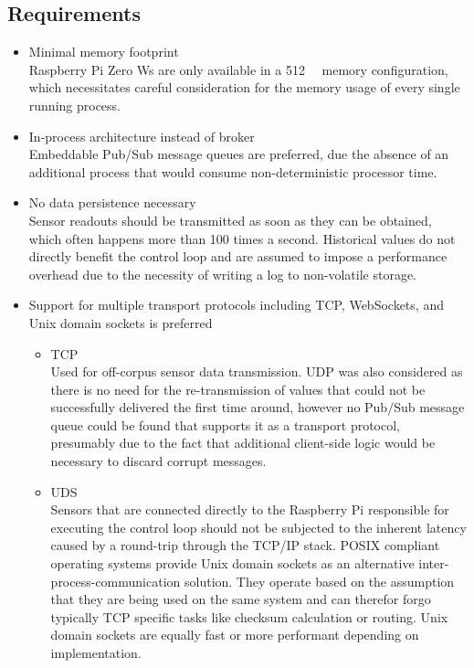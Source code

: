 \subsection{Requirements}
\begin{itemize}
  \item Minimal memory footprint \\
  Raspberry Pi Zero Ws are only available in a \SI{512}{\mega\byte} memory configuration, which necessitates careful consideration for the memory usage of every single running process.
  \item In-process architecture instead of broker \\
  Embeddable Pub/Sub message queues are preferred, due the absence of an additional process that would consume non-deterministic processor time.
  \item No data persistence necessary \\
  Sensor readouts should be transmitted as soon as they can be obtained, which often happens more than 100 times a second. Historical values do not directly benefit the control loop and are assumed to impose a performance overhead due to the necessity of writing a log to non-volatile storage. 
  \item Support for multiple transport protocols including TCP, WebSockets, and Unix domain sockets is preferred \\
  \begin{itemize}
  	\item TCP \\
  	Used for off-corpus sensor data transmission. UDP was also considered as there is no need for the re-transmission of values that could not be successfully delivered the first time around, however no Pub/Sub message queue could be found that supports it as a transport protocol, presumably due to the fact that additional client-side logic would be necessary to discard corrupt messages.
  	\item UDS \\
  	Sensors that are connected directly to the Raspberry Pi responsible for executing the control loop should not be subjected to the inherent latency caused by a round-trip through the TCP/IP stack. POSIX \cite{posix-spec} compliant operating systems provide Unix domain sockets as an alternative inter-process-communication solution. They operate based on the assumption that they are being used on the same system and can therefor forgo typically TCP specific tasks like checksum calculation or routing. Unix domain sockets are equally fast or more performant depending on implementation.

\end{itemize}
\end{itemize}
